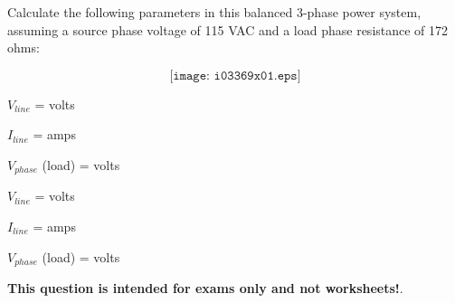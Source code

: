 

Calculate the following parameters in this balanced 3-phase power system, assuming a source phase voltage of 115 VAC and a load phase resistance of 172 ohms:

$$\texttt{[image: i03369x01.eps]}$$

$V_{line}$ = \underbar{\hskip 50pt} volts

\vskip 10pt

$I_{line}$ = \underbar{\hskip 50pt} amps

\vskip 10pt

$V_{phase}$ (load) = \underbar{\hskip 50pt} volts







$V_{line}$ =  volts

$I_{line}$ =  amps

$V_{phase}$ (load) =  volts







{\bf This question is intended for exams only and not worksheets!}.


